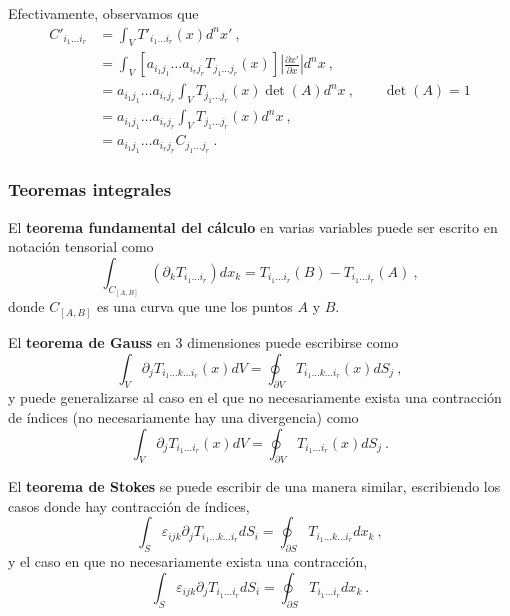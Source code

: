 Efectivamente, observamos que
\begin{align}
    C'_{i_1 \dots i_r} & = \int_V T'_{i_1 \dots i_r}(x) d^n x' \ , \\
    & = \int_V [a_{i_1 j_1} \dots a_{i_r j_r} T_{j_1 \dots j_r}(x)] \left| \frac{\partial x'}{\partial x} \right| d^n x \ , \\
    & = a_{i_1 j_1} \dots a_{i_r j_r} \int_V T_{j_1 \dots j_r}(x) \det(A) d^n x \ , \qquad \det(A) = 1 \\
    & = a_{i_1 j_1} \dots a_{i_r j_r} \int_V T_{j_1 \dots j_r}(x) d^n x \ , \\
    & = a_{i_1 j_1} \dots a_{i_r j_r} C_{j_1 \dots j_r} \ .
\end{align}

\subsubsection*{Teoremas integrales}

El \textbf{teorema fundamental del cálculo} en varias variables puede ser escrito en notación tensorial como
\begin{equation}
    \int_{C_{[A,B]}} (\partial_k T_{i_1 \dots i_r}) dx_k = T_{i_1 \dots i_r}(B) - T_{i_1 \dots i_r}(A) \ ,
\end{equation}
donde $C_{[A,B]}$ es una curva que une los puntos $A$ y $B$.

El \textbf{teorema de Gauss} en 3 dimensiones puede escribirse como
\begin{equation}
    \int_V \partial_j T_{i_1 \dots k \dots i_r}(x) dV = \oint_{\partial V} T_{i_1 \dots k \dots i_r} (x) dS_j \ ,
\end{equation}
y puede generalizarse al caso en el que no necesariamente exista una contracción de índices (no necesariamente hay una divergencia) como
\begin{equation}
    \int_V \partial_j T_{i_1 \dots i_r}(x) dV = \oint_{\partial V} T_{i_1 \dots i_r} (x) dS_j \ .
\end{equation}

El \textbf{teorema de Stokes} se puede escribir de una manera similar, escribiendo los casos donde hay contracción de índices,
\begin{equation}
    \int_S \varepsilon_{ijk} \partial_j T_{i_1 \dots k \dots i_r} dS_i = \oint_{\partial S} T_{i_1 \dots k \dots i_r} dx_k \ ,
\end{equation}
y el caso en que no necesariamente exista una contracción,
\begin{equation}
    \int_S \varepsilon_{ijk} \partial_j T_{i_1 \dots i_r} dS_i = \oint_{\partial S} T_{i_1 \dots i_r} dx_k \ .
\end{equation}